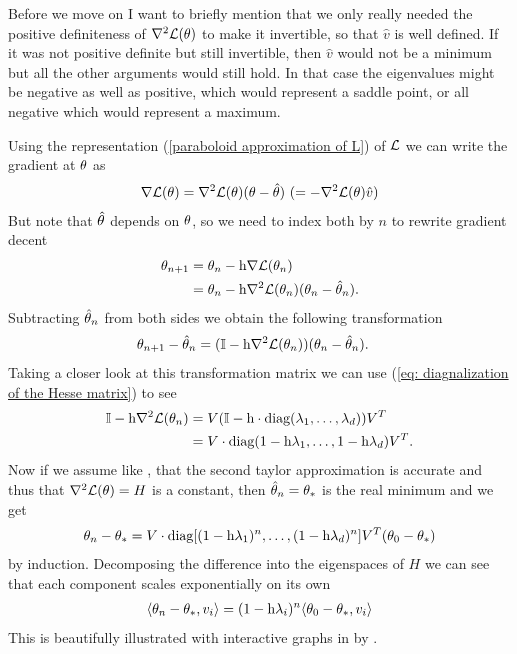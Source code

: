 Before we move on I want to briefly mention that we only really needed the
positive definiteness of \(\nabla^2 \mathcal{L}(\theta)\) to make it invertible, so that
\(\hat{v}\) is well defined. If it was not positive definite but still invertible,
then \(\hat{v}\) would not be a minimum but all the other arguments would still
hold.
In that case the eigenvalues might be negative as well as positive, which would
represent a saddle point, or all negative which would represent a maximum.

Using the representation (\ref{paraboloid approximation of L}) of \(\mathcal{L}\) we
can write the gradient at \(\theta\) as
%
\begin{align*}
	\nabla \mathcal{L}(\theta)
	=  \nabla^2 \mathcal{L}(\theta)(\theta-\hat{\theta})
	\ (= -\nabla^2 \mathcal{L}(\theta)\hat{v})
\end{align*}
%
But note that \(\hat{\theta}\) depends on \(\theta\), so we need to index both
by \(n\) to rewrite gradient decent
%
\begin{align*}
	\theta_{n+1} &= \theta_n - \text{h}\nabla \mathcal{L}(\theta_n)\\
	&= \theta_n - \text{h}\nabla^2 \mathcal{L}(\theta_n)(\theta_n - \hat{\theta}_n).
\end{align*}
%
Subtracting \(\hat{\theta}_n\) from both sides we obtain the following
transformation 
%
\begin{align}\label{eq: Matrix GD Formulation}
	\theta_{n+1} - \hat{\theta}_n
	&= (\mathbb{I} - \text{h}\nabla^2 \mathcal{L}(\theta_n) ) (\theta_n - \hat{\theta}_n).
\end{align}
%
Taking a closer look at this transformation matrix we can use (\ref{eq:
diagnalization of the Hesse matrix}) to see
%
\begin{align*}
	\mathbb{I} - \text{h}\nabla^2 \mathcal{L}(\theta_n)
	&= V(\mathbb{I} - \text{h}\cdot\text{diag}(\lambda_1,\dots,\lambda_d) )V^T \\
	&= V\cdot\text{diag}(1-\text{h}\lambda_1, \dots,1-\text{h}\lambda_d)V^T.
\end{align*}
%
Now if we assume like \textcite{gohWhyMomentumReally2017}, that the second
taylor approximation is accurate and thus that \(\nabla^2 \mathcal{L}(\theta)=H\) is a
constant, then \(\hat{\theta}_n = \theta_*\) is the real minimum and we get
%
\begin{align}
	\theta_n - \theta_*
	= V\cdot\text{diag}[(1-\text{h}\lambda_1)^n,\dots,(1-\text{h}\lambda_d)^n] V^T (\theta_0 - \theta_*)
\end{align}
%
by induction. Decomposing the difference into the eigenspaces of \(H\) we can 
see that each component scales exponentially on its own 
%
\begin{align*}
	\langle \theta_n -\theta_*, v_i\rangle
	= (1-\text{h}\lambda_i)^n \langle \theta_0 - \theta_*, v_i\rangle
\end{align*}
%
This is beautifully illustrated with interactive graphs in
 by \citeauthor{gohWhyMomentumReally2017}.


